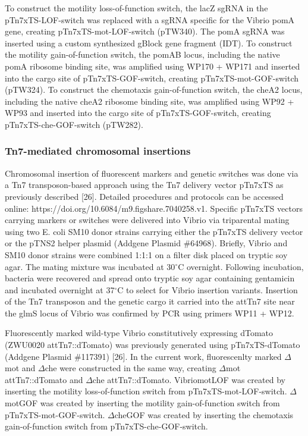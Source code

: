 To construct the motility loss-of-function switch, the lacZ sgRNA in the pTn7xTS-LOF-switch was replaced with a sgRNA specific for the Vibrio pomA gene, creating pTn7xTS-mot-LOF-switch (pTW340). The pomA sgRNA was inserted using a custom synthesized gBlock gene fragment (IDT). To construct the motility gain-of-function switch, the pomAB locus, including the native pomA ribosome binding site, was amplified using WP170 + WP171 and inserted into the cargo site of pTn7xTS-GOF-switch, creating pTn7xTS-mot-GOF-switch (pTW324). To construct the chemotaxis gain-of-function switch, the cheA2 locus, including the native cheA2 ribosome binding site, was amplified using WP92 + WP93 and inserted into the cargo site of pTn7xTS-GOF-switch, creating pTn7xTS-che-GOF-switch (pTW282).

\subsubsection{Tn7-mediated chromosomal insertions}
Chromosomal insertion of fluorescent markers and genetic switches was done via a Tn7 transposon-based approach using the Tn7 delivery vector pTn7xTS as previously described [26]. Detailed procedures and protocols can be accessed online: https://doi.org/10.6084/m9.figshare.7040258.v1. Specific pTn7xTS vectors carrying markers or switches were delivered into Vibrio via triparental mating using two E. coli SM10 donor strains carrying either the pTn7xTS delivery vector or the pTNS2 helper plasmid (Addgene Plasmid \#64968). Briefly, Vibrio and SM10 donor strains were combined 1:1:1 on a filter disk placed on tryptic soy agar. The mating mixture was incubated at 30$^\circ$C overnight. Following incubation, bacteria were recovered and spread onto tryptic soy agar containing gentamicin and incubated overnight at 37$^\circ$C to select for Vibrio insertion variants. Insertion of the Tn7 transposon and the genetic cargo it carried into the attTn7 site near the glmS locus of Vibrio was confirmed by PCR using primers WP11 + WP12.

Fluorescently marked wild-type Vibrio constitutively expressing dTomato (ZWU0020 attTn7::dTomato) was previously generated using pTn7xTS-dTomato (Addgene Plasmid \#117391) [26]. In the current work, fluorescenlty marked $\Delta$mot and $\Delta$che were constructed in the same way, creating $\Delta$mot attTn7::dTomato  and $\Delta$che attTn7::dTomato. VibriomotLOF was created by inserting the motility loss-of-function switch from pTn7xTS-mot-LOF-switch. $\Delta$motGOF was created by inserting the motility gain-of-function switch from pTn7xTS-mot-GOF-switch. $\Delta$cheGOF was created by inserting the chemotaxis gain-of-function switch from pTn7xTS-che-GOF-switch.

